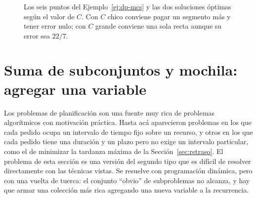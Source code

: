 \documentclass[12pt, spanish, oneside, openany]{book}
\theoremstyle{uprightplain}
\theoremstyle{definition}
\theoremstyle{remark}
\theoremstyle{definition}
\begin{document}
\begin{figure}[H]
\centering
{}
\caption{Los seis puntos del Ejemplo~\ref{ej:dp-mcs} y las dos soluciones
óptimas según el valor de $C$. Con $C$ chico conviene pagar un segmento más y
tener error nulo; con $C$ grande conviene una sola recta aunque su error sea
$22/7$.}
\label{fig:dp-mcs-ejemplo}
\end{figure}


\section{Suma de subconjuntos y mochila: agregar una variable}
\label{sec:dp-mochila}

Los problemas de planificación son una fuente muy rica de problemas algorítmicos con motivación práctica. Hasta acá aparecieron problemas en los que cada pedido ocupa un intervalo de tiempo fijo sobre un recurso, y otros en los que cada pedido tiene una duración y un plazo pero no exige un intervalo particular, como el de minimizar la tardanza máxima de la Sección~\ref{sec:retraso}. El problema de esta sección es una versión del segundo tipo que es difícil de resolver directamente con las técnicas vistas. Se resuelve con programación dinámica, pero con una vuelta de tuerca: el conjunto ``obvio'' de subproblemas no alcanza, y hay que armar una colección más rica agregando una nueva variable a la recurrencia.
\end{document}
